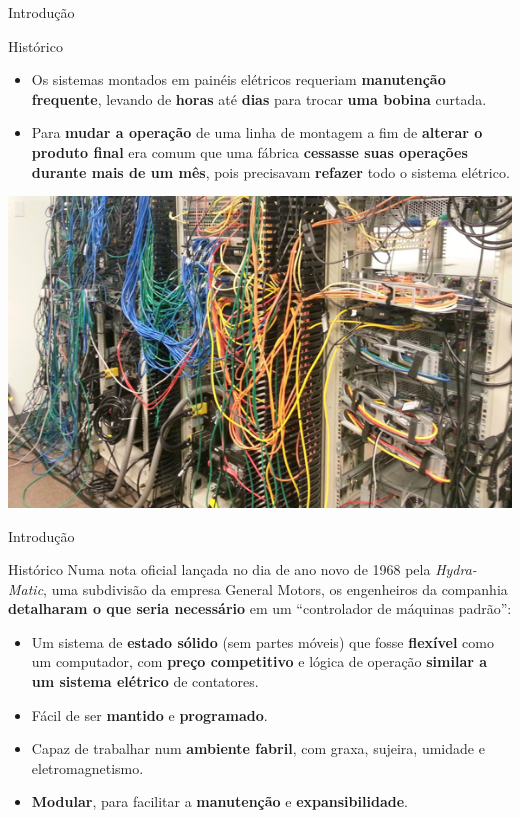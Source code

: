 \begin{frame}{Introdução}
	\begin{block}{Histórico}
		\begin{itemize}
			\item Os sistemas montados em painéis elétricos requeriam \textbf{manutenção frequente}, levando de \textbf{horas} até \textbf{dias} para trocar \textbf{uma bobina} curtada.
			\item Para \textbf{mudar a operação} de uma linha de montagem a fim de \textbf{alterar o produto final} era comum que uma fábrica \textbf{cessasse suas operações durante mais de um mês}, pois precisavam \textbf{refazer} todo o sistema elétrico.
		\end{itemize}
	\end{block}
	
	\centering
	\includegraphics[width=0.5\linewidth]{Figuras/Ch08/fig4}
\end{frame}


\begin{frame}{Introdução}
	\begin{block}{Histórico}
		Numa nota oficial lançada no dia de ano novo de 1968 pela \textit{Hydra-Matic}, uma subdivisão da empresa General Motors, os engenheiros da companhia \textbf{detalharam o que seria necessário} em um ``controlador de máquinas padrão'':
		\begin{itemize}
			\item Um sistema de \textbf{estado sólido} (sem partes móveis) que fosse \textbf{flexível} como um computador, com \textbf{preço competitivo} e lógica de operação \textbf{similar a um sistema elétrico} de contatores.
			\item Fácil de ser \textbf{mantido} e \textbf{programado}.
			\item Capaz de trabalhar num \textbf{ambiente fabril}, com graxa, sujeira, umidade e eletromagnetismo.
			\item \textbf{Modular}, para facilitar a \textbf{manutenção} e \textbf{expansibilidade}.
		\end{itemize}
	\end{block}
\end{frame}


